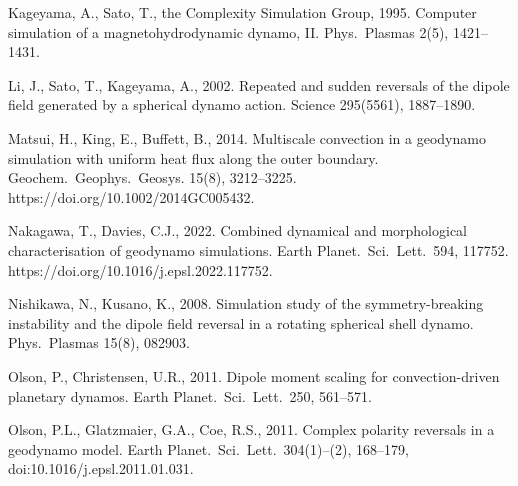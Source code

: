 \begin{list}
Kageyama, A., Sato, T., the Complexity Simulation Group, 1995. Computer simulation of a magnetohydrodynamic dynamo, II. Phys.\ Plasmas 2(5), 1421--1431.
%
\item
Li, J., Sato, T., Kageyama, A., 2002. Repeated and sudden reversals of the dipole field generated by a spherical dynamo action. Science 295(5561), 1887--1890.
%
%
\item
Matsui, H., King, E., Buffett, B., 2014. Multiscale convection in a geodynamo simulation with uniform heat flux along the outer boundary. Geochem.\ Geophys.\ Geosys. 15(8), 3212--3225. https://doi.org/10.1002/2014GC005432.
%
%
\item
\sloppy
Nakagawa, T., Davies, C.J., 2022. Combined dynamical and morphological characterisation of geodynamo simulations. Earth Planet.\ Sci.\ Lett.\ 594, 117752. https://doi.org/10.1016/j.epsl.2022.117752. 
%
\item
Nishikawa, N., Kusano, K., 2008. Simulation study of the symmetry-breaking instability and the dipole field reversal in a rotating spherical shell dynamo. Phys.\ Plasmas 15(8), 082903.
%
%
\item 
Olson, P., Christensen, U.R., 2011. Dipole moment scaling for convection-driven planetary dynamos. Earth Planet.\ Sci.\ Lett.\ 250, 561--571.
%
\item
\sloppy
Olson, P.L., Glatzmaier, G.A., Coe, R.S., 2011. Complex polarity reversals in a geodynamo model. Earth Planet.\ Sci.\ Lett.\ 304(1)--(2), 168--179, doi:10.1016/j.epsl.2011.01.031.

\end{list}
